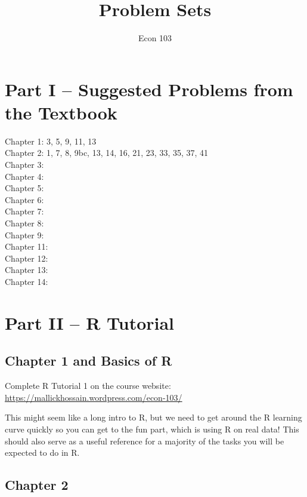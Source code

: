 \documentclass[addpoints,12pt]{exam}
\title{Problem Sets}
\author{Econ 103}
\date{}
\begin{document}
\maketitle

\section*{Part I -- Suggested Problems from the Textbook}
Chapter 1: 3, 5, 9, 11, 13
\\
Chapter 2: 1, 7, 8, 9bc, 13, 14, 16, 21, 23, 33, 35, 37, 41
\\
Chapter 3: 
\\
Chapter 4: 
\\
Chapter 5:
\\
Chapter 6:
\\
Chapter 7:
\\
Chapter 8:
\\
Chapter 9:
\\
Chapter 11:
\\
Chapter 12:
\\
Chapter 13:
\\
Chapter 14:

 \section*{Part II -- R Tutorial}
 \subsection*{Chapter 1 and Basics of R}
Complete R Tutorial 1 on the course website:
\\
\url{https://mallickhossain.wordpress.com/econ-103/}

This might seem like a long intro to R, but we need to get around the R learning curve quickly so you can get to the fun part, which is using R on real data! This should also serve as a useful reference for a majority of the tasks you will be expected to do in R.

\subsection*{Chapter 2}
\end{document}
